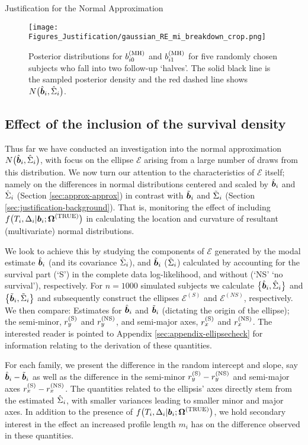 \begin{chapter}{\label{cha:justification}Justification for the Normal Approximation}
  \begin{figure}[ht]
      \centering
      \texttt{[image: Figures\_Justification/gaussian\_RE\_mi\_breakdown\_crop.png]}
      \caption{Posterior distributions for $b_{i0}^{(\mathrm{MH})}$ and $b_{i1}^{(\mathrm{MH})}$ for five randomly chosen subjects who fall into two follow-up `halves'. The solid black line is the sampled posterior density and the red dashed line shows $N\big(\hat{\bm{b}}_i,\hat{\Sigma}_i\big)$.}
      \label{fig:justification-gaussian-breakdown}
  \end{figure}

  \subsection{Effect of the inclusion of the survival density}\label{sec:justification-include-surv-ellipse}
  Thus far we have conducted an investigation into the normal approximation $N\big(\hat{\bm{b}}_i,\hat{\Sigma}_i\big)$, with focus on the ellipse $\mathcal{E}$ arising from a large number of draws from this distribution. We now turn our attention to the characteristics of $\mathcal{E}$ itself; namely on the differences in normal distributions centered and scaled by $\hat{\bm{b}}_i$ and $\hat{\Sigma}_i$ (\ie Section \ref{sec:approx-approx}) in contrast with $\tilde{\bm{b}}_i$ and $\tilde{\Sigma}_i$ (Section \ref{sec:justification-background}). That is, monitoring the effect of including $f\big(T_i,\Delta_i|\bm{b}_i;\bm{\mathrm{\Omega}}^{(\mathrm{TRUE})}\big)$ in calculating the location and curvature of resultant (multivariate) normal distributions.
  
  We look to achieve this by studying the components of $\mathcal{E}$ generated by the modal estimate $\hat{\bm{b}}_i$ (and its covariance $\hat{\Sigma}_i$), and $\tilde{\bm{b}}_i$ ($\tilde{\Sigma}_i$) calculated by accounting for the survival part (`S') in the complete data log-likelihood, and without (`NS' \ie `no survival'), respectively. For $n=1000$ simulated subjects we calculate $\big\{\hat{\bm{b}}_i,\hat{\Sigma}_i\big\}$ and $\big\{\tilde{\bm{b}}_i,\tilde{\Sigma}_i\big\}$ and subsequently construct the ellipses $\mathcal{E}^{(S)}$ and $\mathcal{E}^{(NS)}$, respectively. We then compare: Estimates for $\hat{\bm{b}}_i$ and $\tilde{\bm{b}}_i$ (dictating the origin of the ellipse); the semi-minor, $r_y^{(\mathrm{S})}$ and $r_y^{(\mathrm{NS})}$, and semi-major axes, $r_x^{(\mathrm{S})}$ and $r_x^{(\mathrm{NS})}$. The interested reader is pointed to Appendix \ref{sec:appendix-ellipsecheck} for information relating to the derivation of these quantities.

  For each family, we present the difference in the random intercept and slope, say $\hat{\bm{b}}_i-\tilde{\bm{b}}_i$ as well as the difference in the semi-minor $r_y^{(\mathrm{S})}-r_y^{(\mathrm{NS})}$ and semi-major axes $r_x^{(\mathrm{S})}-r_x^{(\mathrm{NS})}$. The quantities related to the ellipsis' axes directly stem from the estimated $\hat{\Sigma}_i$, with smaller variances leading to smaller minor and major axes. In addition to the presence of $f\big(T_i,\Delta_i|\bm{b}_i;\bm{\mathrm{\Omega}}^{(\mathrm{TRUE})}\big)$, we hold secondary interest in the effect an increased profile length $m_i$ has on the difference observed in these quantities. 
  

\end{chapter}
